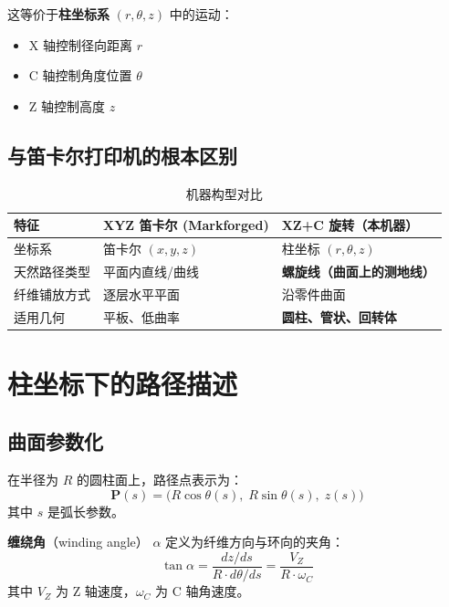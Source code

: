 \documentclass[11pt,a4paper]{article}
\begin{document}
这等价于\textbf{柱坐标系} $(r, \theta, z)$ 中的运动：
\begin{itemize}[nosep]
\item X 轴控制径向距离 $r$
\item C 轴控制角度位置 $\theta$
\item Z 轴控制高度 $z$
\end{itemize}

\subsection{与笛卡尔打印机的根本区别}

\begin{table}[H]
\centering
\begin{tabularx}{\textwidth}{l X X}
\toprule
\textbf{特征} & \textbf{XYZ 笛卡尔 (Markforged)} & \textbf{XZ+C 旋转（本机器）} \\
\midrule
坐标系 & 笛卡尔 $(x,y,z)$ & 柱坐标 $(r,\theta,z)$ \\
天然路径类型 & 平面内直线/曲线 & \textcolor{accent}{\textbf{螺旋线（曲面上的测地线）}} \\
纤维铺放方式 & 逐层水平平面 & 沿零件曲面 \\
适用几何 & 平板、低曲率 & \textcolor{pass}{\textbf{圆柱、管状、回转体}} \\
\bottomrule
\end{tabularx}
\caption{机器构型对比}
\end{table}


\section{柱坐标下的路径描述}

\subsection{曲面参数化}

在半径为 $R$ 的圆柱面上，路径点表示为：
\begin{equation}
\mathbf{P}(s) = \big(R\cos\theta(s),\; R\sin\theta(s),\; z(s)\big)
\end{equation}
其中 $s$ 是弧长参数。

\textbf{缠绕角}（winding angle） $\alpha$ 定义为纤维方向与环向的夹角：
\begin{equation}
\tan\alpha = \frac{dz/ds}{R \cdot d\theta/ds} = \frac{V_Z}{R \cdot \omega_C}
\end{equation}
其中 $V_Z$ 为 Z 轴速度，$\omega_C$ 为 C 轴角速度。
\end{document}
